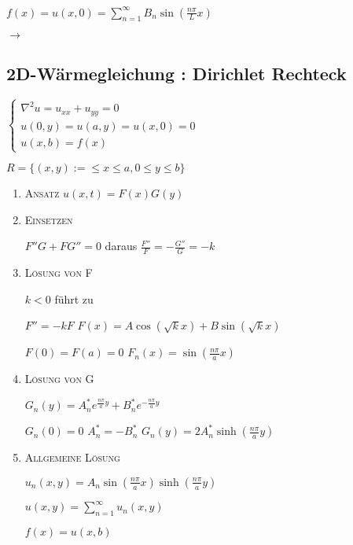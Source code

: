 \documentclass[10pt,a4paper]{scrartcl}
\begin{document}
\begin{multicols*}{3}
\begin{enumerate}
	$f(x)=u(x,0)=\sum_{n=1}^\infty{B_n\sin(\frac{n\pi}{L}x)}$
	 
	$\rightarrow$ 
	
	\end{enumerate}
	
	\finn
	
	\subsection{2D-Wärmegleichung : Dirichlet Rechteck}
	
	\begin{center}
	$\begin{cases}
	\nabla^2u=u_{xx}+u_{yy}=0\\
	u(0,y)=u(a,y)=u(x,0)=0\\
	u(x,b)=f(x)
	\end{cases}$
	\end{center}
			
	$R = \{(x,y):=\leq x\leq a, 0\leq y \leq b \}$	
	
	\begin{enumerate}
	\item \scshape{Ansatz} $u(x,t)=F(x)G(y)$
	\item \scshape{Einsetzen}
	
	$F''G+FG''=0$ \hspace{2ex} daraus \hspace{2ex} $\frac{F''}{F}=-\frac{G''}{G}=-k$
	
	\item \scshape{Lösung von F}
	
	$k<0$ führt zu
	
	$F''=-kF$ \dahe $F(x)=A\cos(\sqrt{k}x)+B\sin(\sqrt{k}x)$
	
	$F(0)=F(a)=0$ \dahe $F_n(x)=\sin(\frac{n\pi}{a}x)$
	
	\item \scshape{Lösung von G}
	
	$G_n(y)=A_n^*e^{\frac{n\pi}{a}y}+B_n^*e^{-\frac{n\pi}{a}y}$
	
	$G_n(0)=0$ \dahe $A_n^*=-B_n^*$ \dahe $G_n(y)=2A_n^*\sinh(\frac{n\pi}{a}y)$
	
	\item \scshape{Allgemeine Lösung}
	
	$u_n(x,y)=A_n\sin(\frac{n\pi}{a}x)\sinh(\frac{n\pi}{a}y)$
	
	$u(x,y)=\sum_{n=1}^\infty{u_n(x,y)}$
	
	$f(x)=u(x,b)$ \dahe {}
	

\end{enumerate}
\end{multicols*}
\end{document}
